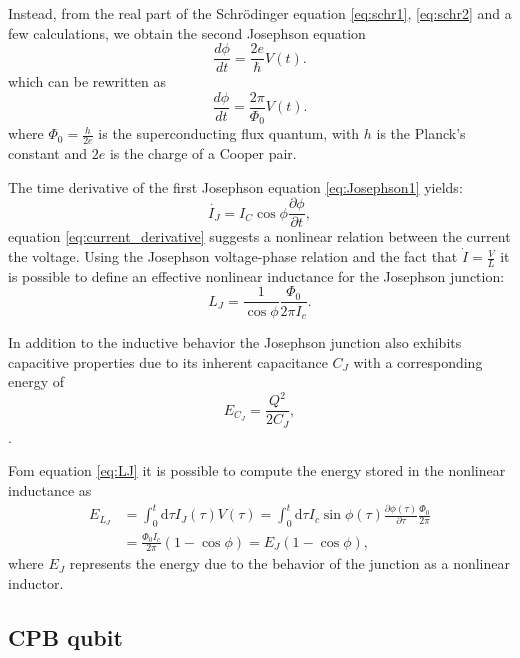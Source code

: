 Instead, from the real part of the Schr\"odinger equation \ref{eq:schr1}, \ref{eq:schr2} and a few calculations, we obtain the second Josephson equation
\begin{equation}\label{eq:Josephson2}
    \frac{d\phi}{dt} = \frac{2e}{\hbar} V(t).
\end{equation}
which can be rewritten as \begin{equation}
    \frac{d\phi}{dt} = \frac{2\pi}{\Phi_0} V(t).
\end{equation}
where $\Phi_0 = \frac{h}{2e}$ is the superconducting flux quantum, with $h$ is the Planck's constant and $2e$ is the charge of a Cooper pair.

The time derivative of the first Josephson equation \ref{eq:Josephson1} yields:
\begin{equation}\label{eq:current_derivative}
    \dot{I_J}=I_C\cos{\phi}\frac{\partial \phi}{\partial t},
\end{equation}
equation \ref{eq:current_derivative} suggests a nonlinear relation between the current the voltage. 
Using the Josephson voltage-phase relation and the fact that $\dot{I}=\frac{V}{L}$ it is possible to define an effective nonlinear inductance for the Josephson junction:
\begin{equation}\label{eq:LJ}
    L_J = \frac{1}{\cos{\phi}}\frac{\Phi_0}{2\pi I_c}.
\end{equation} 

In addition to the inductive behavior the Josephson junction also exhibits capacitive properties due to its inherent capacitance $C_J$ with a corresponding energy of 
\begin{equation}\label{eq:capacitive_energy}
    E_{C_J} = \frac{Q^2}{2C_J},
\end{equation}.

Fom equation \ref{eq:LJ} it is possible to compute the energy stored in the nonlinear inductance as
\begin{align}\label{eq:inductive_energy}
    E_{L_J} &= \int_{0}^{t}\text{d}\tau I_J(\tau)V(\tau) = \int_{0}^{t}\text{d}\tau I_c\sin{\phi(\tau)}\frac{\partial\phi(\tau)}{\partial\tau}\frac{\Phi_0}{2\pi}\\
    &= \frac{\Phi_0 I_c}{2\pi}(1-\cos{\phi}) = E_J(1-\cos{\phi}),
\end{align}
where $E_J$ represents the energy due to the behavior of the junction as a nonlinear inductor.

\subsection{CPB qubit}

